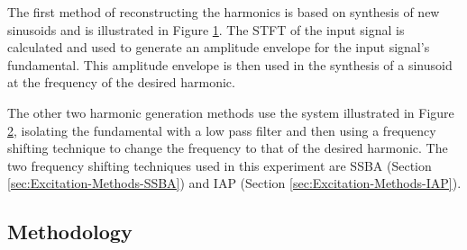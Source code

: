 		The first method of reconstructing the harmonics is based on synthesis of new sinusoids and is illustrated
		in Figure \ref{fig:Synthesise}. The STFT of the input signal is calculated and used to generate an amplitude
		envelope for the input signal's fundamental. This amplitude envelope is then used in the synthesis of a
		sinusoid at the frequency of the desired harmonic.

		\begin{figure}[h!]
			\centering
			\caption{}
			\label{fig:Synthesise}
		\end{figure}

		The other two harmonic generation methods use the system illustrated in Figure \ref{fig:FilterAndShift},
		isolating the fundamental with a low pass filter and then using a frequency shifting technique to change the
		frequency to that of the desired harmonic. The two frequency shifting techniques used in this experiment are
		SSBA (Section \ref{sec:Excitation-Methods-SSBA}) and IAP (Section \ref{sec:Excitation-Methods-IAP}).

		\begin{figure}[h!]
			\centering
			\caption{}
			\label{fig:FilterAndShift}
		\end{figure}

	\subsection{Methodology}
	\label{sec:PerceptualExperiments-Reconstruction-Methodology}
